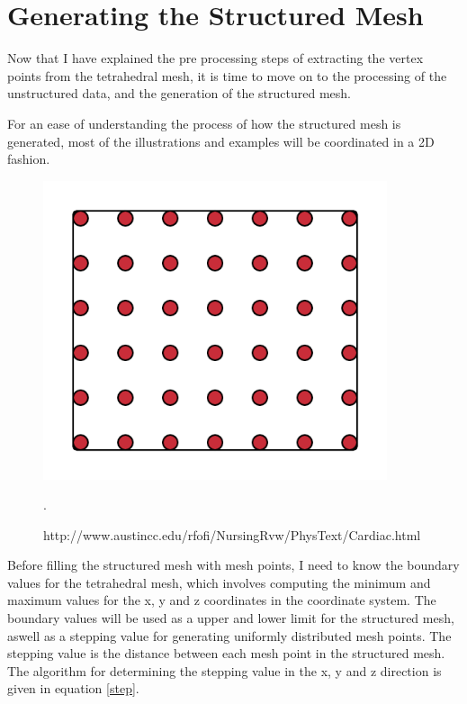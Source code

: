\section{Generating the Structured Mesh}
\label{generating_the structured_mesh}
Now that I have explained the pre processing steps of extracting the vertex points from the tetrahedral mesh, it is time to move on to the processing of the unstructured data, and the generation of the structured mesh.

For an ease of understanding the process of how the structured mesh is generated, most of the illustrations and examples will be coordinated in a 2D fashion.

\begin{figure}[h]
 \centering 
     \includegraphics[width=0.9\textwidth]{bilder/m_grid_points}
     \caption{http://www.austincc.edu/rfofi/NursingRvw/PhysText/Cardiac.html}.
     \label{m_grid_points.png}
\end{figure}

Before filling the structured mesh with mesh points, I need to know the boundary values for the tetrahedral mesh, which involves computing the minimum and maximum values for the x, y and z coordinates in the coordinate system. The boundary values will be used as a upper and lower limit for the structured mesh, aswell as a stepping value for generating uniformly distributed mesh points. The stepping value is the distance between each mesh point in the structured mesh. The algorithm for determining the stepping value in the x, y and z direction is given in equation \ref{step}.


